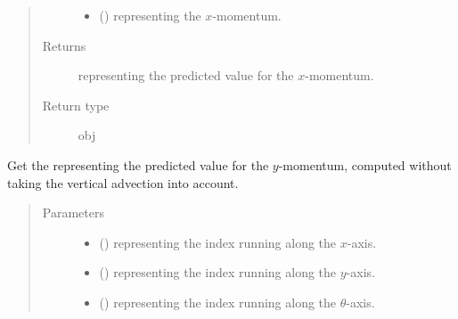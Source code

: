 \documentclass[letterpaper,10pt,english]{sphinxmanual}
\begin{document}
\begin{fulllineitems}
\begin{fulllineitems}
\begin{quote}
\begin{description}
\begin{itemize}
\item {} 
 () \textendash{}  representing the \(x\)-momentum.

\end{itemize}

\item[{Returns}] \leavevmode
{} representing the predicted value for the \(x\)-momentum.

\item[{Return type}] \leavevmode
obj

\end{description}\end{quote}

\end{fulllineitems}


\begin{fulllineitems}
\label{\detokenize{api:dycore.flux_isentropic_maccormack.FluxIsentropicMacCormack._get_maccormack_horizontal_predicted_value_V}}
Get the  representing the predicted value for the \(y\)-momentum,
computed without taking the vertical advection into account.
\begin{quote}\begin{description}
\item[{Parameters}] \leavevmode\begin{itemize}
\item {} 
 () \textendash{}  representing the index running along the \(x\)-axis.

\item {} 
 () \textendash{}  representing the index running along the \(y\)-axis.

\item {} 
 () \textendash{}  representing the index running along the \(\theta\)-axis.


\end{itemize}
\end{description}
\end{quote}
\end{fulllineitems}
\end{fulllineitems}
\end{document}
